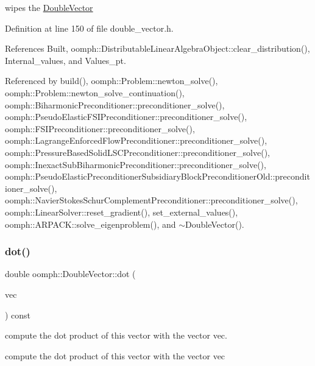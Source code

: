 wipes the \hyperlink{classoomph_1_1DoubleVector}{Double\+Vector} 



Definition at line 150 of file double\+\_\+vector.\+h.



References Built, oomph\+::\+Distributable\+Linear\+Algebra\+Object\+::clear\+\_\+distribution(), Internal\+\_\+values, and Values\+\_\+pt.



Referenced by build(), oomph\+::\+Problem\+::newton\+\_\+solve(), oomph\+::\+Problem\+::newton\+\_\+solve\+\_\+continuation(), oomph\+::\+Biharmonic\+Preconditioner\+::preconditioner\+\_\+solve(), oomph\+::\+Pseudo\+Elastic\+F\+S\+I\+Preconditioner\+::preconditioner\+\_\+solve(), oomph\+::\+F\+S\+I\+Preconditioner\+::preconditioner\+\_\+solve(), oomph\+::\+Lagrange\+Enforced\+Flow\+Preconditioner\+::preconditioner\+\_\+solve(), oomph\+::\+Pressure\+Based\+Solid\+L\+S\+C\+Preconditioner\+::preconditioner\+\_\+solve(), oomph\+::\+Inexact\+Sub\+Biharmonic\+Preconditioner\+::preconditioner\+\_\+solve(), oomph\+::\+Pseudo\+Elastic\+Preconditioner\+Subsidiary\+Block\+Preconditioner\+Old\+::preconditioner\+\_\+solve(), oomph\+::\+Navier\+Stokes\+Schur\+Complement\+Preconditioner\+::preconditioner\+\_\+solve(), oomph\+::\+Linear\+Solver\+::reset\+\_\+gradient(), set\+\_\+external\+\_\+values(), oomph\+::\+A\+R\+P\+A\+C\+K\+::solve\+\_\+eigenproblem(), and $\sim$\+Double\+Vector().

\mbox{\label{classoomph_1_1DoubleVector_abd20e2e394c8e08749ed34c7228c8506}} 
\subsubsection{\texorpdfstring{dot()}{dot()}}
{\footnotesize\ttfamily double oomph\+::\+Double\+Vector\+::dot (\begin{DoxyParamCaption}\item[{const \hyperlink{classoomph_1_1DoubleVector}{Double\+Vector} \&}]{vec }\end{DoxyParamCaption}) const}



compute the dot product of this vector with the vector vec. 

compute the dot product of this vector with the vector vec 

